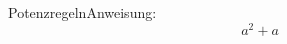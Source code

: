 \documentclass[convert={density=300,size=1080x800,outext=.png}]{standalone}
\begin{document}
\begin{mytheo*}{Potenzregeln}{Anweisung: $$a^2+a$$}

\end{mytheo*}
\end{document}

